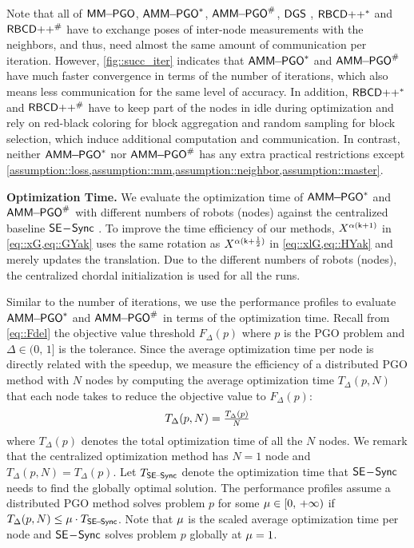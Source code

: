  Note that all of $\mathsf{MM\!\!-\!\!PGO}$, $\mathsf{AMM\!\!-\!\!PGO}^*$, $\mathsf{AMM\!\!-\!\!PGO}^{\#}$, $\mathsf{DGS}$ \cite{choudhary2017distributed}, $\rbcdc$ \cite{tian2019distributed} and $\rbcdd$ \cite{tian2019distributed} have to exchange poses of inter-node measurements with the neighbors, and thus, need almost the same amount of communication per iteration. However, \cref{fig::succ_iter} indicates that $\mathsf{AMM\!\!-\!\!PGO}^*$ and $\mathsf{AMM\!\!-\!\!PGO}^{\#}$ have much faster convergence in terms of the number of iterations, which also means less communication for the same level of accuracy. In addition, $\rbcdc$ and $\rbcdd$ have to keep part of the nodes in idle during optimization and rely on red-black coloring for block aggregation and random sampling for block selection, which induce additional computation and communication. In contrast, neither $\mathsf{AMM\!\!-\!\!PGO}^*$ nor $\mathsf{AMM\!\!-\!\!PGO}^{\#}$ has any extra practical restrictions except \cref{assumption::loss,assumption::mm,assumption::neighbor,assumption::master}.



\textbf{Optimization Time.} We evaluate the optimization time of $\mathsf{AMM\!\!-\!\!PGO}^*$ and $\mathsf{AMM\!\!-\!\!PGO}^{\#}$ with different numbers of robots (nodes) against the centralized baseline $\mathsf{SE\!-\!Sync}$ \cite{rosen2016se}. To improve the  time efficiency of our methods, $X^{\alpha(\mathsf{k}+1)}$ in \cref{eq::xG,eq::GYak}  uses the same rotation as $X^{\alpha(\mathsf{k}+\frac{1}{2})}$ in \cref{eq::xlG,eq::HYak} and merely updates the translation. Due to the different numbers of robots (nodes), the centralized chordal initialization \cite{carlone2015initialization} is used for all the runs.

Similar to the number of iterations, we use the performance profiles to evaluate $\mathsf{AMM\!\!-\!\!PGO}^*$ and $\mathsf{AMM\!\!-\!\!PGO}^{\#}$ in terms of the optimization time. Recall from \cref{eq::Fdel} the objective value threshold $F_{\Delta}(p)$ where $p$ is the PGO problem and $\Delta\in(0,\,1]$ is the tolerance. Since the average optimization time per node is directly related with the speedup, we measure the efficiency of a distributed PGO method with $N$ nodes by computing the average optimization time $T_{\Delta}(p,N)$ that each node takes to reduce the objective value to $F_{\Delta}(p)$:
\vspace{-0.25em}
\begin{equation}\label{eq::TdeltaN}
T_{\Delta}(p,N)=\tfrac{T_\Delta(p)}{N}
\vspace{-0.25em}
\end{equation}
where $T_\Delta(p)$ denotes the total optimization time of all the $N$ nodes. We remark that the centralized optimization method has $N=1$ node and $T_{\Delta}(p,N)=T_{\Delta}(p)$. Let $T_{\mathsf{SE\!-\!Sync}}$ denote the optimization time that $\mathsf{SE\!-\!Sync}$ needs to find the globally optimal solution. The performance profiles assume a distributed PGO method solves problem $p$  for some $\mu\in[0,\,+\infty)$ if $T_{\Delta}(p,N)\leq \mu\cdot T_{\mathsf{SE\!-\!Sync}}$. Note that $\mu$ is the scaled average optimization time per node and $\mathsf{SE\!-\!Sync}$ solves problem $p$ globally at $\mu=1$. 

